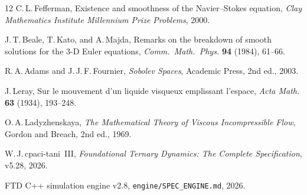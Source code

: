 \documentclass[11pt]{article}
\theoremstyle{tight}
\theoremstyle{plainroman}
\begin{document}
\begin{thebibliography}{12}
C.\,L.\,Fefferman,
Existence and smoothness of the Navier--Stokes equation,
\emph{Clay Mathematics Institute Millennium Prize Problems}, 2000.

J.\,T.\,Beale, T.\,Kato, and A.\,Majda,
Remarks on the breakdown of smooth solutions for the 3-D Euler equations,
\emph{Comm.\ Math.\ Phys.} \textbf{94} (1984), 61--66.

R.\,A.\,Adams and J.\,J.\,F.\,Fournier,
\emph{Sobolev Spaces},
Academic Press, 2nd ed., 2003.

J.\,Leray,
Sur le mouvement d'un liquide visqueux emplissant l'espace,
\emph{Acta Math.} \textbf{63} (1934), 193--248.

O.\,A.\,Ladyzhenskaya,
\emph{The Mathematical Theory of Viscous Incompressible Flow},
Gordon and Breach, 2nd ed., 1969.

W.\,J.\,cpaci-tani~III,
\emph{Foundational Ternary Dynamics: The Complete Specification}, v5.28, 2026.

FTD C++ simulation engine v2.8, \texttt{engine/SPEC\_ENGINE.md}, 2026.
\end{thebibliography}
\end{document}
